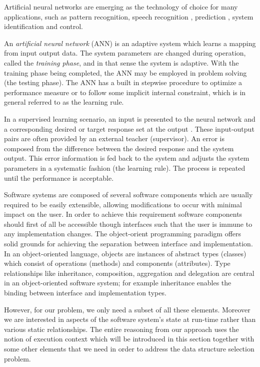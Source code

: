 Artificial neural networks are emerging as the technology of choice for many applications, such as pattern recognition, speech recognition \cite{ann3}, prediction \cite{ann4}, system identification and control.

An \emph{artificial neural network} (ANN) \cite{ann1} is an adaptive system which learns a mapping from input output data. The system parameters are changed during operation, called the \emph{training phase}, and in that sense the system is adaptive. 
With the training phase being completed, the ANN may be employed in problem solving (the testing phase). The ANN has a built in stepwise procedure to optimize a performance measure or to follow some implicit internal constraint, which is in general referred to as the learning rule.

In a supervised learning scenario, an input is presented to the neural network and a corresponding desired or target response set at the output \cite{ann2}. These input-output pairs are often provided by an external teacher (supervisor). An error is composed from the difference between the desired response and the system output. This error information is fed back to the system and adjusts the system parameters in a systematic fashion (the learning rule). The process is repeated until the performance is acceptable.

Software systems are composed of several software components which are usually required to be easily extensible, allowing modifications to occur with minimal impact on the user. In order to achieve this requirement software components should first of all be accessible though interfaces such that the user is immune to any implementation changes. The object-orient programming paradigm offers solid grounds for achieving the separation between interface and implementation. In an object-oriented language, objects are instances of abstract types (classes) which consist of operations (methods) and components (attributes). Type relationships like inheritance, composition, aggregation and delegation are central in an object-oriented software system; for example inheritance enables the binding between interface and implementation types. 

However, for our problem, we only need a subset of all these elements. Moreover we are interested in aspects of the software system's state at run-time rather than various static relationships. The entire reasoning from our  approach uses the notion of execution context which will be introduced in this section together with some other elements that we need in order to address the data structure selection problem. 

